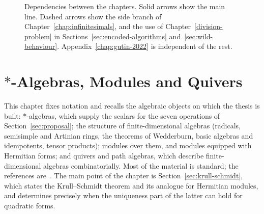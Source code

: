 \documentclass[12pt, a4paper]{report}
\theoremstyle{plain}
\theoremstyle{definition}
\theoremstyle{remark}
\theoremstyle{plain}
\begin{document}
\begin{figure}[ht]
\centering
{}
\caption{Dependencies between the chapters. Solid arrows show the main line. Dashed arrows show the side branch of Chapter~\ref{chap:infinitesimals}, and the use of Chapter~\ref{division-problem} in Sections~\ref{sec:encoded-algorithms} and~\ref{sec:wild-behaviour}. Appendix~\ref{chap:gutin-2022} is independent of the rest.}
\label{fig:reading-guide}
\end{figure}
\chapter{\texorpdfstring{$*$}{*}-Algebras, Modules and Quivers}
\label{chap:staralg}

This chapter fixes notation and recalls the algebraic objects on which the thesis is built: $*$-algebras, which supply the scalars for the seven operations of Section~\ref{sec:proposal}; the structure of finite-dimensional algebras (radicals, semisimple and Artinian rings, the theorems of Wedderburn, basic algebras and idempotents, tensor products); modules over them, and modules equipped with Hermitian forms; and quivers and path algebras, which describe finite-dimensional algebras combinatorially. Most of the material is standard; the references are~\cite{Lam2001,Knus1991,Scharlau1985,KMRT1998,AssemSimsonSkowronski2006}. The main point of the chapter is Section~\ref{sec:krull-schmidt}, which states the Krull--Schmidt theorem and its analogue for Hermitian modules, and determines precisely when the uniqueness part of the latter can hold for quadratic forms.
\end{document}
